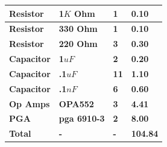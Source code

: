 \documentclass{article}	%
\begin{document}
\begin{multicols}{2}
\begin{center}
\begin{tabularx}{0.4\textwidth}{|X|X|X|X|}
        \textbf{Resistor} &
        \textbf{1$K$ Ohm } &
        \textbf{1} &
        \textbf{0.10} \\
        \hline

        \textbf{Resistor} &
        \textbf{330 Ohm } &
        \textbf{1} &
        \textbf{0.10} \\
        \hline

        \textbf{Resistor} &
        \textbf{220 Ohm} &
        \textbf{3} &
        \textbf{0.30} \\
        \hline

        \textbf{Capacitor} &
        \textbf{1$uF$ } &
        \textbf{2} &
        \textbf{0.20} \\
        \hline

        \textbf{Capacitor} &
        \textbf{.1$uF$} &
        \textbf{11} &
        \textbf{1.10} \\
        \hline

        \textbf{Capacitor} &
        \textbf{.1$nF$} &
        \textbf{6} &
        \textbf{0.60} \\
        \hline

        \textbf{Op Amps} &
        \textbf{OPA552} &
        \textbf{3} &
        \textbf{4.41} \\
        \hline

        \textbf{PGA} &
        \textbf{pga 6910-3} &
        \textbf{2} &
        \textbf{8.00} \\
        \hline

        \hline
        \textbf{Total} &
        \textbf{-} &
        \textbf{-} &
        \textbf{104.84} \\

        \hline
    \end{tabularx}
\end{center}


\end{multicols}
\end{document}
